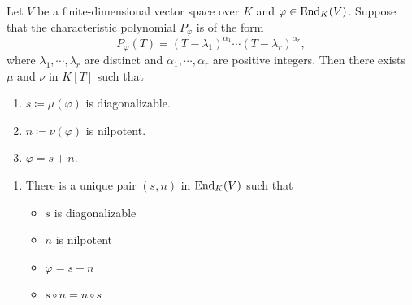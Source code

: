 \begin{theoremenv}
    Let $V$ be a finite-dimensional vector space over $K$ and $\varphi \in \operatorname{\mathrm{End}}_{K}(V)$.
    Suppose that the characteristic polynomial $P_{\varphi}$ is of the form
    $$P_{\varphi}(T) = (T - \lambda_1)^{\alpha_1}\cdots(T - \lambda_r)^{\alpha_r},$$
    where $\lambda_1,\cdots,\lambda_r$ are distinct and $\alpha_1,\cdots,\alpha_r$ are positive integers.
    Then there exists $\mu$ and $\nu$ in $K[T]$ such that
    \begin{enumerate}[label = (\arabic*)]
        \item $s \coloneq \mu(\varphi)$ is diagonalizable.
        \item $n \coloneq \nu(\varphi)$ is nilpotent.
        \item $\varphi = s + n$.
    \end{enumerate}
\end{theoremenv}
\begin{remark}
    \quad
    \begin{enumerate}
        \item There is a unique pair $(s,n)$ in $\operatorname{\mathrm{End}}_{K}(V)$ such that
        \begin{itemize}
            \item $s$ is diagonalizable
            \item $n$ is nilpotent
            \item $\varphi = s + n$
            \item $s \circ n = n \circ s$
        \end{itemize}
    \end{enumerate}
\end{remark}
